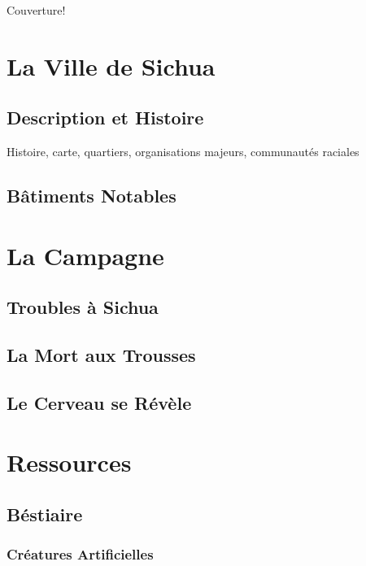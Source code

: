 \documentclass{dd}
\begin{document}
Couverture!

\clearpage

\tableofcontents

\part{La Ville de Sichua}

\chapter{Description et Histoire}

Histoire, carte, quartiers, organisations majeurs, communautés raciales

\chapter{Bâtiments Notables}





\part{La Campagne}

\chapter{Troubles à Sichua}



\chapter{La Mort aux Trousses}

\chapter{Le Cerveau se Révèle}

\part{Ressources}

\chapter{Béstiaire}

\section{Créatures Artificielles}








\end{document}
